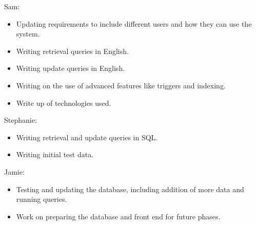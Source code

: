 \documentclass{article}
\begin{document}
Sam:
\begin{itemize}
\item Updating requirements to include different users and how they can use the system.
\item Writing retrieval queries in English.
\item Writing update queries in English.
\item Writing on the use of advanced features like triggers and indexing.
\item Write up of technologies used.
\end{itemize}

Stephanie:
\begin{itemize}
\item Writing retrieval and update queries in SQL.
\item Writing initial test data.
\end{itemize}

Jamie:
\begin{itemize}
\item Testing and updating the database, including addition of more data and running queries.
\item Work on preparing the database and front end for future phases.
\end{itemize}

\section{}
\end{document}
